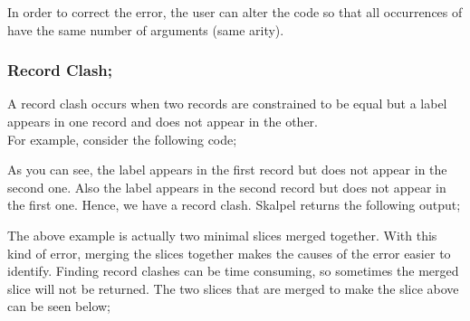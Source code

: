 \documentclass{article}
\begin{document}
\begin{itemize}
In order to correct the error, the user can alter the code so that all
occurrences of  have the same number of arguments
(same arity).


\newpage


\subsubsection {Record Clash;}

\subitem A record clash occurs when two records are constrained to be
equal but a label appears in one record and does not appear in the other.
\\
For example, consider the following code;


As you can see, the label  appears in the first record but does
not appear in the second one. Also the label  appears in
the second record but does not appear in the first one. Hence, we have
a record clash. Skalpel returns the following output;


The above example is actually two minimal slices merged together. With
this kind of error, merging the slices together makes the causes of
the error easier to identify. Finding record clashes can be time
consuming, so sometimes the merged slice will not be returned. The two
slices that are merged to make the slice above can be seen below;





\end{itemize}
\end{document}

